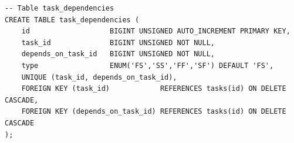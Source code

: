 \begin{lstlisting}[style=sqlstyle,caption={Schéma SQL — Tables users et projects},label={lst:sql_main}]
-- Table task_dependencies
CREATE TABLE task_dependencies (
    id                   BIGINT UNSIGNED AUTO_INCREMENT PRIMARY KEY,
    task_id              BIGINT UNSIGNED NOT NULL,
    depends_on_task_id   BIGINT UNSIGNED NOT NULL,
    type                 ENUM('FS','SS','FF','SF') DEFAULT 'FS',
    UNIQUE (task_id, depends_on_task_id),
    FOREIGN KEY (task_id)            REFERENCES tasks(id) ON DELETE CASCADE,
    FOREIGN KEY (depends_on_task_id) REFERENCES tasks(id) ON DELETE CASCADE
);
\end{lstlisting}
